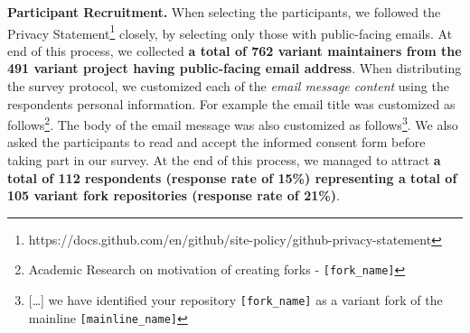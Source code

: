 \nd \textbf{Participant Recruitment.}
When selecting the participants, we followed the \gh Privacy Statement\footnote{https://docs.github.com/en/github/site-policy/github-privacy-statement} closely, by selecting only those with public-facing emails. 
At end of this process, we collected \textbf{a total of 762 variant maintainers from the 491 variant project having public-facing email address}.
When distributing the survey protocol, we customized each of the \textit{email message content} using the respondents personal information. For example the email title was customized as follows\footnote{Academic Research on motivation of creating forks - \texttt{[fork\_name]}}. The body of the email message was also customized as follows\footnote{[\ldots] we have identified your \gh repository \texttt{[fork\_name]} as a variant fork of the mainline \texttt{[mainline\_name]}}.
We also asked the participants to read and accept the informed consent form before taking part in our survey.
At the end of this process, we managed to attract \textbf{a total of 112 respondents (response rate of 15\%) representing a total of 105 variant fork repositories (response rate of 21\%)}.

